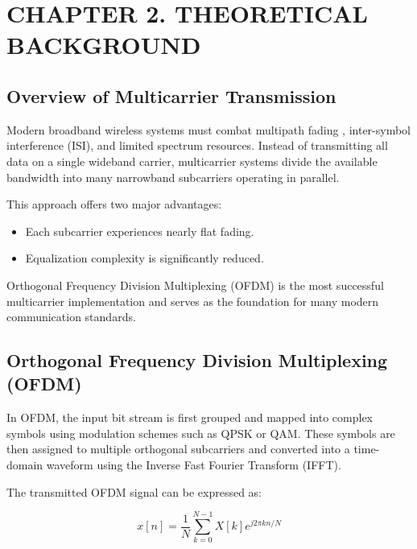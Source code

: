 \section*{CHAPTER 2. THEORETICAL BACKGROUND}

\setcounter{section}{2}
\setcounter{subsection}{0}
\setcounter{figure}{0}
\setcounter{table}{0}
\setcounter{equation}{0}

\subsection{Overview of Multicarrier Transmission}

Modern broadband wireless systems must combat multipath fading \cite{hanzo2004},
inter-symbol interference (ISI), and limited spectrum resources.
Instead of transmitting all data on a single wideband carrier,
multicarrier systems divide the available bandwidth into many narrowband
subcarriers operating in parallel.

This approach offers two major advantages:

\begin{itemize}
    \item Each subcarrier experiences nearly flat fading.
    \item Equalization complexity is significantly reduced.
\end{itemize}

Orthogonal Frequency Division Multiplexing (OFDM) is the most successful
multicarrier implementation and serves as the foundation for many modern
communication standards.

\subsection{Orthogonal Frequency Division Multiplexing (OFDM)}

In OFDM, the input bit stream is first grouped and mapped into complex
symbols using modulation schemes such as QPSK or QAM. These symbols are
then assigned to multiple orthogonal subcarriers and converted into a
time-domain waveform using the Inverse Fast Fourier Transform (IFFT).

The transmitted OFDM signal can be expressed as:

\begin{equation}
x[n] = \frac{1}{N}\sum_{k=0}^{N-1} X[k] e^{j2\pi kn/N}
\end{equation}

